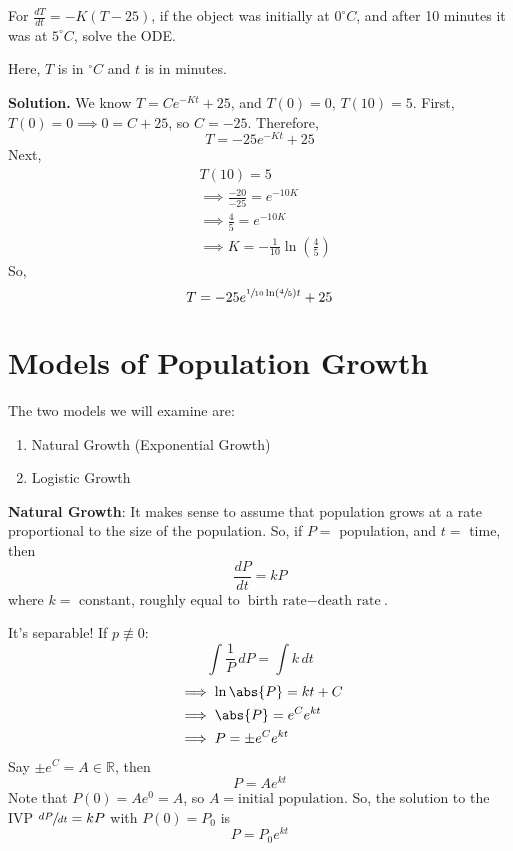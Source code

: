 \begin{Example}{}{}
    For
    $ \displaystyle  \frac{dT}{dt}=-K(T-25)  $,
    if the object was initially at $ 0^\circ C $, and after
    10 minutes it was at $ 5^\circ C $, solve the ODE\@.

    Here,
    $ T $ is in $ ^\circ C $ and $ t $ is in minutes.

    \textbf{Solution.} We know $ T=Ce^{-Kt}+25 $, and $ T(0)=0 $,
    $ T(10)=5 $. First, $ T(0)=0\implies 0=C+25 $, so $ C=-25 $.
    Therefore,
    \[ T=-25e^{-Kt}+25 \]
    Next,
    \begin{align*}
         & T(10)=5                                               \\
         & \implies \frac{-20}{-25} =e^{-10K}                    \\
         & \implies \frac{4}{5} =e^{-10K}                        \\
         & \implies K=-\frac{1}{10}\ln\left( \frac{4}{5} \right)
    \end{align*}
    So,
    \[ T=-25e^{\sfrac{1}{10} \ln\left( \sfrac{4}{5} \right)t}+25 \]
\end{Example}

\section{Models of Population Growth}
The two models we will examine are:
\begin{enumerate}[label=(\Roman*)]
    \item Natural Growth (Exponential Growth)
    \item Logistic Growth
\end{enumerate}
\textbf{Natural Growth}: It makes sense to assume that
population grows at a rate proportional to the size of the population.
So, if $ P= $ population, and $ t= $ time, then
\[ \frac{dP}{dt}=kP  \]
where $ k= $ constant, roughly equal to $ \text{birth rate}-\text{death rate} $.

It's separable! If $ p\not\equiv 0 $:
\[ \int \frac{1}{P} \, d{P}=\int k\, d{t}  \]
\begin{align*}
     & \implies \ln\abs{P}=kt+C    \\
     & \implies \abs{P}=e^C e^{kt} \\
     & \implies P=\pm e^{C}e^{kt}
\end{align*}
Say $ \pm e^C =A\in\mathbb{R} $, then
\[ P=Ae^{kt} \]
Note that $ P(0)=Ae^0=A $, so $ A=\text{initial population} $. So,
the solution to the IVP $ \sfrac{dP}{dt} =kP $ with $ P(0)=P_0 $ is
\[ P=P_0 e^{kt} \]

